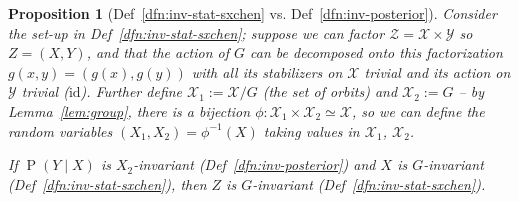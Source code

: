 \documentclass[12pt]{article}
\newcommand{\Prob}[1]{\operatorname{P}\left(#1\right)}
\newtheorem{prop}[thm]{Proposition}
\theoremstyle{definition}
\numberwithin{equation}{section}
\numberwithin{figure}{section}
\numberwithin{table}{section}
\begin{document}
\begin{prop}[Def~\ref{dfn:inv-stat-sxchen} vs. Def~\ref{dfn:inv-posterior}]
    \label{prop:inv-stat-sxchen}
    Consider the set-up in Def~\ref{dfn:inv-stat-sxchen}; suppose we can factor $\mathcal{Z}=\mathcal{X}\times\mathcal{Y}$ so $Z=(X,Y)$, and that the action of $G$ can be decomposed onto this factorization $g(x, y)=(g(x), g(y))$ with all its stabilizers on $\mathcal{X}$ trivial and its action on $\mathcal{Y}$ trivial ($\mathrm{id}$). Further define $\mathcal{X}_1:=\mathcal{X}/G$ (the set of orbits) and $\mathcal{X}_2:=G$ -- by Lemma~\ref{lem:group}, there is a bijection $\phi:\mathcal{X}_1\times \mathcal{X}_2\simeq \mathcal{X}$, so we can define the random variables $(X_1, X_2)=\phi^{-1}(X)$ taking values in $\mathcal{X}_1$, $\mathcal{X}_2$.
    
    If $\Prob{Y\mid X}$ is $X_2$-invariant (Def~\ref{dfn:inv-posterior}) and $X$ is $G$-invariant (Def~\ref{dfn:inv-stat-sxchen}), then $Z$ is $G$-invariant (Def~\ref{dfn:inv-stat-sxchen}).
\end{prop}
\end{document}

